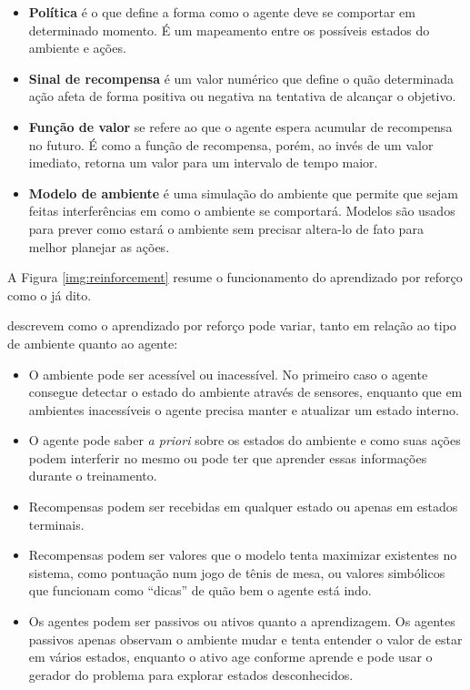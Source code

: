 \begin{itemize}
    \item \textbf{Política} é o que define a forma como o agente deve se comportar em determinado
    momento. É um mapeamento entre os possíveis estados do ambiente e ações.
    
    \item \textbf{Sinal de recompensa} é um valor numérico que define o quão determinada ação afeta
    de forma positiva ou negativa na tentativa de alcançar o objetivo.
    
    \item \textbf{Função de valor} se refere ao que o agente espera acumular de recompensa no
    futuro. É como a função de recompensa, porém, ao invés de um valor imediato, retorna um valor
    para um intervalo de tempo maior.
    
    \item \textbf{Modelo de ambiente} é uma simulação do ambiente que permite  que sejam feitas
    interferências em como o ambiente se comportará. Modelos são usados para prever como estará o
    ambiente sem precisar altera-lo de fato para melhor planejar as ações.
\end{itemize}

A Figura \ref{img:reinforcement} resume o funcionamento do aprendizado por reforço como o já dito.


 descrevem como o aprendizado por reforço pode variar, tanto em
relação ao tipo de ambiente quanto ao agente:

\begin{itemize}
    \item O ambiente pode ser acessível ou inacessível. No primeiro caso o agente consegue detectar
    o estado do ambiente através de sensores, enquanto que em ambientes inacessíveis o agente
    precisa manter e atualizar um estado interno.
    
    \item O agente pode saber \textit{a priori} sobre os estados do ambiente e como suas ações podem
    interferir no mesmo ou pode ter que aprender essas informações durante o treinamento.
    
    \item Recompensas podem ser recebidas em qualquer estado ou apenas em estados terminais.
    
    \item Recompensas podem ser valores que o modelo tenta maximizar existentes no sistema, como
    pontuação num jogo de tênis de mesa, ou valores simbólicos que funcionam como ``dicas'' de quão
    bem o agente está indo.
    
    \item Os agentes podem ser passivos ou ativos quanto a aprendizagem. Os agentes passivos apenas
    observam o ambiente mudar e tenta entender o valor de estar em vários estados, enquanto o ativo
    age conforme aprende e pode usar o gerador do problema para explorar estados desconhecidos.
\end{itemize}

